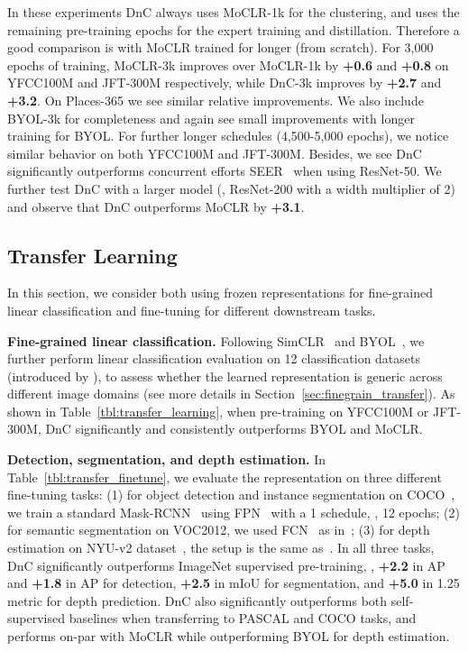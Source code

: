 \documentclass[final]{cvpr}
\newcommand\showdiff[1]{\textbf{\textcolor{nicergreen}{#1}}}
\newcommand\baseline{MoCLR}
\newcommand\jft{JFT-300M}
\newcommand{\apbbox}[1]{AP}
\newcommand{\apmask}[1]{AP}
\begin{document}
In these experiments DnC always uses \baseline{}-1k for the clustering, and uses the remaining pre-training epochs for the expert training and distillation. Therefore a good comparison is with \baseline{} trained for longer (from scratch). For 3,000 epochs of training, \baseline{}-3k improves over \baseline{}-1k by \showdiff{+0.6} and \showdiff{+0.8} on YFCC100M and \jft{} respectively, while DnC-3k improves by \showdiff{+2.7} and \showdiff{+3.2}. On Places-365 we see similar relative improvements. We also include BYOL-3k for completeness and again see small improvements with longer training for BYOL. For further longer schedules (4,500-5,000 epochs), we notice similar behavior on both YFCC100M and \jft{}. Besides, we see DnC significantly outperforms concurrent efforts SEER~\cite{goyal2021self} when using ResNet-50. We further test DnC with a larger model (\ie, ResNet-200 with a width multiplier of 2) and observe that DnC outperforms \baseline{} by \showdiff{+3.1}.

\subsection{Transfer Learning}

In this section, we consider both using frozen representations for fine-grained linear classification and fine-tuning for different downstream tasks.

\noindent\textbf{Fine-grained linear classification.}
Following SimCLR~\cite{chen2020simple} and BYOL~\cite{grill2020bootstrap}, we further perform linear classification evaluation on 12 classification datasets (introduced by \cite{kornblith2019better}), to assess whether the learned representation is generic across different image domains (see more details in Section~\ref{sec:finegrain_transfer}). As shown in Table~\ref{tbl:transfer_learning}, when pre-training on YFCC100M or \jft{}, DnC significantly and consistently outperforms BYOL and \baseline{}. 


\noindent\textbf{Detection, segmentation, and depth estimation.} In Table~\ref{tbl:transfer_finetune}, we evaluate the representation on three different fine-tuning tasks: (1) for object detection and instance segmentation on COCO~\cite{lin2014microsoft}, we train a standard Mask-RCNN~\cite{he2017mask} using FPN~\cite{lin2017feature} with a 1 schedule, \ie, 12 epochs; (2) for semantic segmentation on VOC2012, we used FCN~\cite{long2015fully} as in~\cite{he2020momentum}; (3) for depth estimation on NYU-v2 dataset~\cite{silberman2012indoor}, the setup is the same as~\cite{grill2020bootstrap}. In all three tasks, DnC significantly outperforms ImageNet supervised pre-training, \eg, \showdiff{+2.2} in \apbbox{~} and \showdiff{+1.8} in \apmask{~} for detection, \showdiff{+2.5} in mIoU for segmentation, and \showdiff{+5.0} in 1.25 metric for depth prediction. DnC also significantly outperforms both self-supervised baselines when transferring to PASCAL and COCO tasks, and performs on-par with MoCLR while outperforming BYOL for depth estimation. 
\end{document}
